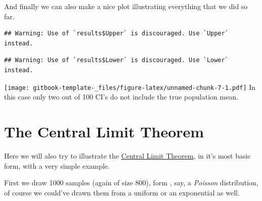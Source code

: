 \documentclass[
]{book}
\newenvironment{Shaded}{\begin{snugshade}}{\end{snugshade}}
\newcommand{\AttributeTok}[1]{\textcolor[rgb]{0.77,0.63,0.00}{#1}}
\newcommand{\DecValTok}[1]{\textcolor[rgb]{0.00,0.00,0.81}{#1}}
\newcommand{\FunctionTok}[1]{\textcolor[rgb]{0.00,0.00,0.00}{#1}}
\newcommand{\NormalTok}[1]{#1}
\newcommand{\OtherTok}[1]{\textcolor[rgb]{0.56,0.35,0.01}{#1}}
\newcommand{\SpecialCharTok}[1]{\textcolor[rgb]{0.00,0.00,0.00}{#1}}
\newcommand{\StringTok}[1]{\textcolor[rgb]{0.31,0.60,0.02}{#1}}
\begin{document}
And finally we can also make a nice plot illustrating everything that we did so far.

\begin{Shaded}
\end{Shaded}

\begin{verbatim}
## Warning: Use of `results$Upper` is discouraged. Use `Upper` instead.
\end{verbatim}

\begin{verbatim}
## Warning: Use of `results$Lower` is discouraged. Use `Lower` instead.
\end{verbatim}

\texttt{[image: gitbook-template-\_files/figure-latex/unnamed-chunk-7-1.pdf]}
In this case only two out of 100 CI's do not include the true population mean.

\hypertarget{the-central-limit-theorem}{%
\section{The Central Limit Theorem}\label{the-central-limit-theorem}}

Here we will also try to illustrate the \href{https://en.wikipedia.org/wiki/Central_limit_theorem}{Central Limit Theorem}, in it's most basic form, with a very simple example.

First we draw 1000 samples (again of size 800), form , say, a \emph{Poisson} distribution, of course we could've drawn them from a uniform or an exponential as well.
\end{document}
